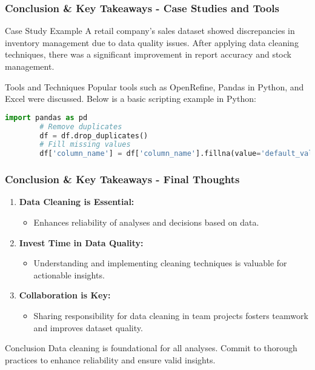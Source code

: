 \documentclass[aspectratio=169]{beamer}
\begin{document}
\begin{frame}[fragile]
    \frametitle{Conclusion \& Key Takeaways - Case Studies and Tools}
    \begin{block}{Case Study Example}
        A retail company's sales dataset showed discrepancies in inventory management due to data quality issues. After applying data cleaning techniques, there was a significant improvement in report accuracy and stock management.
    \end{block}

    \begin{block}{Tools and Techniques}
        Popular tools such as OpenRefine, Pandas in Python, and Excel were discussed. Below is a basic scripting example in Python:
        \begin{lstlisting}[language=Python]
        import pandas as pd
        # Remove duplicates
        df = df.drop_duplicates()
        # Fill missing values
        df['column_name'] = df['column_name'].fillna(value='default_value')
        \end{lstlisting}
    \end{block}
\end{frame}

\begin{frame}[fragile]
    \frametitle{Conclusion \& Key Takeaways - Final Thoughts}
    \begin{enumerate}
        \item \textbf{Data Cleaning is Essential:} 
            \begin{itemize}
                \item Enhances reliability of analyses and decisions based on data.
            \end{itemize}
        \item \textbf{Invest Time in Data Quality:} 
            \begin{itemize}
                \item Understanding and implementing cleaning techniques is valuable for actionable insights.
            \end{itemize}
        \item \textbf{Collaboration is Key:} 
            \begin{itemize}
                \item Sharing responsibility for data cleaning in team projects fosters teamwork and improves dataset quality.
            \end{itemize}
    \end{enumerate}

    \begin{block}{Conclusion}
        Data cleaning is foundational for all analyses. Commit to thorough practices to enhance reliability and ensure valid insights.
    \end{block}
\end{frame}
\end{document}
